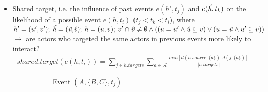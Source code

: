 \begin{itemize}
\begin{itemize}
		\item Shared target, i.e. the influence of past events $e(h',t_j)$ and $e(\text{\emph{\^h}},t_k)$ on the likelihood of a possible event $e(h,t_i)$ ($t_j < t_k < t_i)$, where $h' = (u',v'); \: \text{\emph{\^h}} = (\text{\emph{\^u,\^v}}); \: h = (u,v); \: v' \cap \text{\emph{\^v}} \neq \emptyset \land ((u = u' \land \text{\emph{\^u}} \subseteq v) \lor (u = \text{\emph{\^u}} \land u' \subseteq v))$ $\rightarrow$ are actors who targeted the same actors in previous events more likely to interact?
		\begin{align*}
			shared.target(e(h,t_i)) = \sum_{j \in h.targets} \sum_{a \in \mathcal{A}} \frac{min[d(h.source,\{a\}),d(j,\{a\})]}{\lvert h.targets \rvert}
		\end{align*}
		\begin{figure}
			\begin{mdframed}
				\centering
				\begin{subfigure}[t]{0.3\linewidth}
					\vskip 0pt
					\caption{Event $(A,\{B,C\},t_j)$}
				\end{subfigure}
				\hfill
				\begin{subfigure}[t]{0.3\linewidth}
					\vskip 0pt
\end{subfigure}
\end{mdframed}
\end{figure}
\end{itemize}
\end{itemize}
